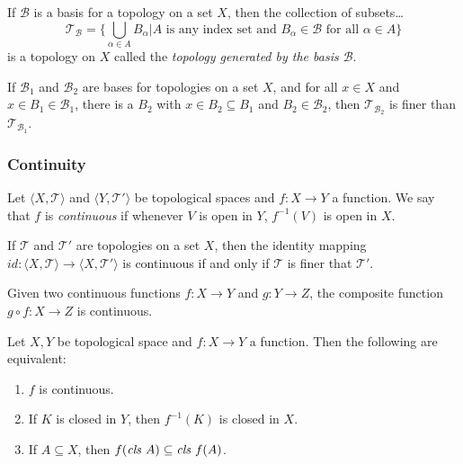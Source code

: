 \begin{proposition}
If $\mathcal{B}$ is a basis for a topology on a set $X$, then the collection of subsets\dots
$$\mathcal{T}_{\mathcal{B}} = \{\bigcup_{\alpha \in A} B_{\alpha} | A \textrm{ is any index set and }B_{\alpha} \in \mathcal{B} \textrm{ for all } \alpha \in A \}$$
is a topology on $X$ called the \emph{topology generated by the basis $\mathcal{B}$}.
\end{proposition}

\begin{proposition}
If $\mathcal{B}_1$ and $\mathcal{B}_2$ are bases for topologies on a set $X$, and for all $x \in X$ and $x \in B_1 \in \mathcal{B}_1$, there is a $B_2$ with $x \in B_2 \subseteq B_1$
and $B_2 \in \mathcal{B}_2$, then $\mathcal{T}_{\mathcal{B}_2}$ is finer than $\mathcal{T}_{\mathcal{B}_1}$.
\end{proposition}

\subsubsection{Continuity}\label{topologicalcontinuity}
Let $\langle X,\mathcal{T} \rangle$ and $\langle Y,\mathcal{T}' \rangle$ be topological spaces and $f:X \rightarrow Y$ a function. We say that $f$ is \emph{continuous} if whenever $V$ is
open in $Y$, $f^{-1}(V)$ is open in $X$.

\begin{proposition}
If $\mathcal{T}$ and $\mathcal{T}'$ are topologies on a set $X$, then the identity mapping $id:\langle X,\mathcal{T} \rangle \rightarrow \langle X,\mathcal{T}' \rangle$ is
continuous if and only if $\mathcal{T}$ is finer that $\mathcal{T}'$.
\end{proposition}

\begin{theorem}
Given two continuous functions $f : X \rightarrow Y$ and $g : Y \rightarrow Z$, the composite function $g \circ f : X \rightarrow Z$ is continuous.
\end{theorem}

\begin{theorem}
Let $X, Y$ be topological space and $f : X \rightarrow Y$ a function. Then the following are equivalent:
\begin{enumerate}
  \item $f$ is continuous.
  \item If $K$ is closed in $Y$, then $f^{-1}(K)$ is closed in $X$.
  \item If $A \subseteq X$, then $f(\emph{cls }A) \subseteq \emph{cls }f(A)$.
\end{enumerate}
\end{theorem}


